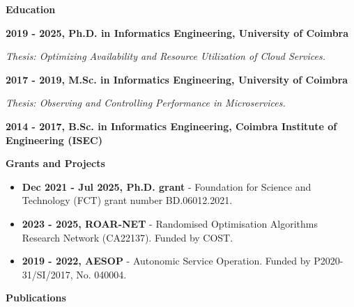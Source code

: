 \documentclass[a4paper,9pt]{memoir}
\newcommand{\Sep}{\vspace{1em}} %
\newcommand{\SmallSep}{\vspace{0.5em}} %
\newcommand{\CVSection}[1]{ %
    {\Large\textbf{#1}}\par
    \SmallSep %
}
\newcommand{\CVItem}[2]{ %
    \textbf{\color{RoyalBlue} #1}\par
    #2
    \SmallSep %
}
\begin{document}
\Sep

\CVSection{Education}

\CVItem{2019 - 2025, Ph.D. in Informatics Engineering, University of Coimbra}{
\emph{Thesis: Optimizing Availability and Resource Utilization of Cloud Services.}
}

\CVItem{2017 - 2019, M.Sc. in Informatics Engineering, University of Coimbra}{\emph{Thesis: Observing and Controlling Performance in Microservices.}}

\CVItem{2014 - 2017, B.Sc. in Informatics Engineering, Coimbra Institute of Engineering (ISEC)}

\Sep

\CVSection{Grants and Projects}

\begin{itemize}[leftmargin=*]
    \item \textbf{Dec 2021 - Jul 2025, Ph.D. grant} - Foundation for Science and Technology (FCT) grant number BD.06012.2021.
    \item \textbf{2023 - 2025, ROAR-NET} - Randomised Optimisation Algorithms Research Network (CA22137). Funded by COST.
    \item \textbf{2019 - 2022, AESOP} - Autonomic Service Operation. Funded by P2020-31/SI/2017, No. 040004.
\end{itemize}

\Sep

\CVSection{Publications}
\end{document}
